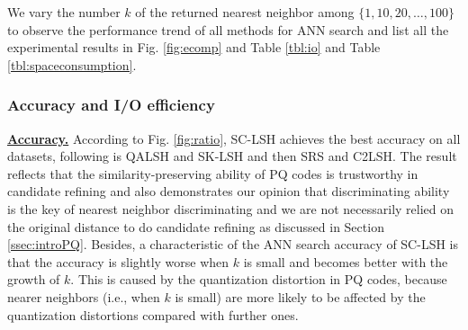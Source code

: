 \documentclass[twocolumn]{svjour3}          %
\newcommand{\btitle}[1]{\vspace{1ex}\noindent\underline{\textbf{#1}}}
\begin{document}
We vary the number $k$ of the returned nearest neighbor among $\{1,10,20,\ldots,100\}$ to observe the performance trend of all methods for ANN search and list all the experimental results in Fig. \ref{fig:ecomp} and Table \ref{tbl:io} and Table \ref{tbl:spaceconsumption}.

\subsubsection{Accuracy and I/O efficiency}
\noindent\btitle{Accuracy.} According to Fig. \ref{fig:ratio}, SC-LSH achieves the best accuracy on all datasets, following is QALSH and SK-LSH and then SRS and C2LSH.
The result reflects that the similarity-preserving ability of PQ codes is trustworthy in candidate refining and also demonstrates our opinion that discriminating ability is the key of nearest neighbor discriminating and we are not necessarily relied on the original distance to do candidate refining as discussed in Section \ref{ssec:introPQ}.
Besides, a characteristic of the ANN search accuracy of SC-LSH is that the accuracy is slightly worse when $k$ is small and becomes better with the growth of $k$. This is caused by the quantization distortion in PQ codes, because nearer neighbors (i.e., when $k$ is small) are more likely to be affected by the quantization distortions compared with further ones.
\end{document}
